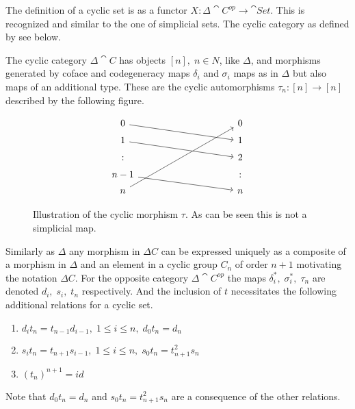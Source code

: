 \documentclass[../../main.tex]{subfiles}
\begin{document}
    The definition of a cyclic set is as a functor $X:\Delta \cat{C^{op}} \to \cat{Set}$. This is recognized and similar to the one of simplicial sets. The cyclic category as defined by \cite{loday-cyclic} see below.
    
    \begin{definition}
        The cyclic category $\Delta \cat{C}$ has objects $[n], \;n\in N$, like $\Delta$, and morphisms generated by coface and codegeneracy maps $\delta_i$ and $\sigma_i$ maps as in $\Delta$ but also maps of an additional type. These are the cyclic automorphisms $\tau_n:[n]\to [n]$ described by the following figure.
    \end{definition}

    \begin{figure}[H]
        \[
            \begin{tikzcd}[row sep = 1ex, column sep = 10em]
                0 \arrow[dr] & 0 \\
                1 \arrow[dr] & 1 \\
                :  & 2 \\
                n-1 \arrow[dr] & :\\
                n \arrow[uuuur] & n            
            \end{tikzcd}
        \]
        \caption{Illustration of the cyclic morphism $\tau$. As can be seen this is not a simplicial map.}
    \end{figure}

    Similarly as $\Delta$ any morphism in $\Delta C$ can be expressed uniquely as a composite of a morphism in $\Delta$ and an element in a cyclic group $C_n$ of order $n+1$ motivating the notation $\Delta C$. For the opposite category $\Delta \cat{C^{op}}$ the maps $\delta_i^*, \; \sigma_i^*,\;\tau_n$ are denoted $d_i,\; s_i, \; t_n$ respectively. And the inclusion of $t$ necessitates the following additional relations for a cyclic set.
    
    \begin{enumerate}
        \item $d_it _n = t_{n-1}d_{i-1},\; 1 \leq i\leq n, \; d_0t_n=d_n$
        \item $s_i t _n = t_{n+1}s_{i-1},\; 1 \leq i\leq n, \; s_0t_n=t_{n+1}^2s_n$
        \item $(t_{n})^{n+1}=id$
    
    \end{enumerate}
    
    Note that $d_0t_n=d_n$ and $s_0t_n=t_{n+1}^2s_n$ are a consequence of the other relations. 
\end{document}
